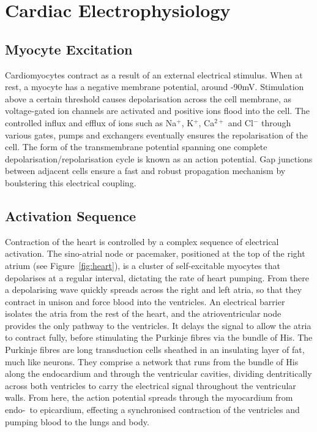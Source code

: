 \section{Cardiac Electrophysiology}
\label{sec:electrophysiology}
  \subsection{Myocyte Excitation}
  \label{sub:myocyte_excitation}
    Cardiomyocytes contract as a result of an external electrical stimulus. When at rest, a myocyte has a negative membrane potential, around -90mV. Stimulation above a certain threshold causes depolarisation across the cell membrane, as voltage-gated ion channels are activated and positive ions flood into the cell. The controlled influx and efflux of ions such as Na$^+$, K$^+$, Ca$^{2+}$ and Cl$^-$ through various gates, pumps and exchangers eventually ensures the repolarisation of the cell. The form of the transmembrane potential spanning one complete depolarisation/repolarisation cycle is known as an action potential. Gap junctions between adjacent cells ensure a fast and robust propagation mechanism by boulstering this electrical coupling.
  
  \subsection{Activation Sequence}
  \label{sub:activation_sequence}
    Contraction of the heart is controlled by a complex sequence of electrical activation. The sino-atrial node or pacemaker, positioned at the top of the right atrium (see Figure~\ref{fig:heart}), is a cluster of self-excitable myocytes that depolarises at a regular interval, dictating the rate of heart pumping. From there a depolarising wave quickly spreads across the right and left atria, so that they contract in unison and force blood into the ventricles. An electrical barrier isolates the atria from the rest of the heart, and the atrioventricular node provides the only pathway to the ventricles. It delays the signal to allow the atria to contract fully, before stimulating the Purkinje fibres via the bundle of His. The Purkinje fibres are long transduction cells sheathed in an insulating layer of fat, much like neurons. They comprise a network that runs from the bundle of His along the endocardium and through the ventricular cavities, dividing dentritically across both ventricles to carry the electrical signal throughout the ventricular walls. From here, the action potential spreads through the myocardium from endo-~to epicardium, effecting a synchronised contraction of the ventricles and pumping blood to the lungs and body.
    
